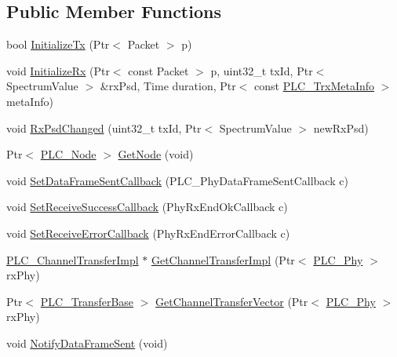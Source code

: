 \subsection*{\-Public \-Member \-Functions}
\begin{DoxyCompactItemize}
\item 
bool \hyperlink{classns3_1_1PLC__Phy_a4087fbae09bdb778285c0e7cdc307d2e}{\-Initialize\-Tx} (\-Ptr$<$ \-Packet $>$ p)
\item 
void \hyperlink{classns3_1_1PLC__Phy_abe32cc0f1c2e7c9de36a37812423df8e}{\-Initialize\-Rx} (\-Ptr$<$ const \-Packet $>$ p, uint32\-\_\-t tx\-Id, \-Ptr$<$ \-Spectrum\-Value $>$ \&rx\-Psd, \-Time duration, \-Ptr$<$ const \hyperlink{classns3_1_1PLC__TrxMetaInfo}{\-P\-L\-C\-\_\-\-Trx\-Meta\-Info} $>$ meta\-Info)
\item 
void \hyperlink{classns3_1_1PLC__Phy_a37c13147b5d5cb71843be91c1654fc18}{\-Rx\-Psd\-Changed} (uint32\-\_\-t tx\-Id, \-Ptr$<$ \-Spectrum\-Value $>$ new\-Rx\-Psd)
\item 
\-Ptr$<$ \hyperlink{classns3_1_1PLC__Node}{\-P\-L\-C\-\_\-\-Node} $>$ \hyperlink{classns3_1_1PLC__Phy_ac671d3c0e8fbe3792f4ee16e7f8998a2}{\-Get\-Node} (void)
\item 
void \hyperlink{classns3_1_1PLC__Phy_a970811df6124983c58f6b578a986f336}{\-Set\-Data\-Frame\-Sent\-Callback} (\-P\-L\-C\-\_\-\-Phy\-Data\-Frame\-Sent\-Callback c)
\item 
void \hyperlink{classns3_1_1PLC__Phy_abd23f344001a334bc6b2981e1f9e096d}{\-Set\-Receive\-Success\-Callback} (\-Phy\-Rx\-End\-Ok\-Callback c)
\item 
void \hyperlink{classns3_1_1PLC__Phy_a67ae8c7bf4a78a5788408f507b179bcc}{\-Set\-Receive\-Error\-Callback} (\-Phy\-Rx\-End\-Error\-Callback c)
\item 
\hyperlink{classns3_1_1PLC__ChannelTransferImpl}{\-P\-L\-C\-\_\-\-Channel\-Transfer\-Impl} $\ast$ \hyperlink{classns3_1_1PLC__Phy_a2901b7bc2979a2637c665c5501ef6d4a}{\-Get\-Channel\-Transfer\-Impl} (\-Ptr$<$ \hyperlink{classns3_1_1PLC__Phy}{\-P\-L\-C\-\_\-\-Phy} $>$ rx\-Phy)
\item 
\-Ptr$<$ \hyperlink{classns3_1_1PLC__ValueBase}{\-P\-L\-C\-\_\-\-Transfer\-Base} $>$ \hyperlink{classns3_1_1PLC__Phy_a5c9c1582a62bd748c8b09b294eb95a83}{\-Get\-Channel\-Transfer\-Vector} (\-Ptr$<$ \hyperlink{classns3_1_1PLC__Phy}{\-P\-L\-C\-\_\-\-Phy} $>$ rx\-Phy)
\item 
void \hyperlink{classns3_1_1PLC__Phy_a51e432fe0945a6b810e0f5d240b2ff55}{\-Notify\-Data\-Frame\-Sent} (void)
\end{DoxyCompactItemize}
